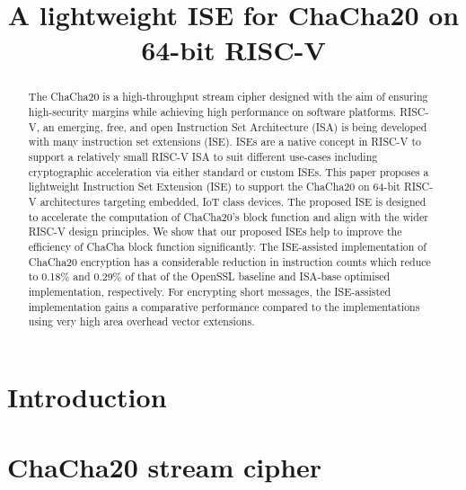 \documentclass[preprint]{iacrtrans}
\title{A lightweight ISE for ChaCha20 on 64-bit RISC-V}
\author{}
\institute{}
\begin{document}

\maketitle

\begin{abstract}
The ChaCha20 is a high-throughput stream cipher designed with the aim of ensuring high-security margins while achieving high performance on software platforms. RISC-V, an emerging, free, and open Instruction Set Architecture (ISA) is being developed with many instruction set extensions (ISE). ISEs are a native concept in RISC-V to support a relatively small RISC-V ISA to suit different use-cases including cryptographic acceleration via either standard or custom ISEs. This paper proposes a lightweight Instruction Set Extension (ISE) to support the ChaCha20 on 64-bit RISC-V architectures targeting embedded, IoT class devices. The proposed ISE is designed to accelerate the computation of ChaCha20's block function and align with the wider RISC-V design principles. We show that our proposed ISEs help to improve the efficiency of ChaCha block function significantly. The ISE-assisted implementation of ChaCha20 encryption has a considerable reduction in instruction counts which reduce to 0.18\% and 0.29\% of that of the OpenSSL baseline and ISA-base optimised implementation, respectively. For encrypting short messages, the ISE-assisted implementation gains a
comparative performance compared to the implementations using very high area overhead vector extensions.
\end{abstract}



\section{Introduction}
\label{sec:intro}


\section{ChaCha20 stream cipher}
\label{sec:bg}

\end{document}
